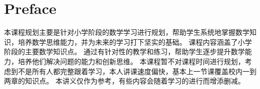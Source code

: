 \documentclass[../Main.tex]{subfiles}
\begin{document}
\chapter*{Preface}

本课程规划主要是针对小学阶段的数学学习进行规划，帮助学生系统地掌握数学知识，培养数学思维能力，并为未来的学习打下坚实的基础。
课程内容涵盖了小学阶段的主要数学知识点。\newline
\indent 通过有针对性的教学和练习，帮助学生逐步提升数学能力，培养他们解决问题的能力和创新思维。 \newline
\indent 本课程暂不对课程时间进行规划，考虑到不是所有人都完整跟着学习，本人讲课速度偏快，基本上一节课覆盖校内一到两章的知识点。\newline
\indent 本讲义仅作为参考，有些内容会随着学习的进行而增添删减。
\end{document}
